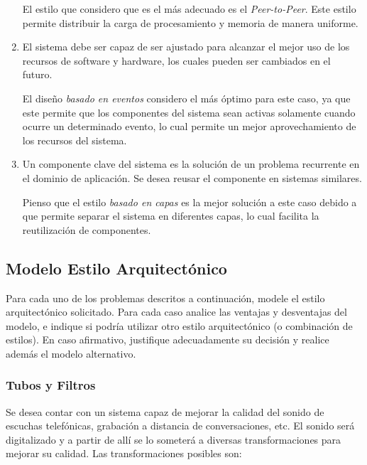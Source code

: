 \begin{enumerate}
			El estilo que considero que es el más adecuado es el \emph{Peer-to-Peer}.
			Este estilo permite distribuir la carga de procesamiento y memoria
			de manera uniforme.

		\item El sistema debe ser capaz de ser ajustado para alcanzar el mejor
			uso de los recursos de software y hardware, los cuales pueden
			ser cambiados en el futuro.

			El diseño \emph{basado en eventos} considero el más óptimo para
			este caso, ya que este permite que los componentes del sistema
			sean activas solamente cuando ocurre un determinado evento, lo cual
			permite un mejor aprovechamiento de los recursos del sistema.

		\item Un componente clave del sistema es la solución de un problema
			recurrente en el dominio de aplicación. Se desea reusar el
			componente en sistemas similares.

			Pienso que el estilo \emph{basado en capas} es la mejor solución
			a este caso debido a que permite separar el sistema en diferentes
			capas, lo cual facilita la reutilización de componentes.
	\end{enumerate}

	\subsection{Modelo Estilo Arquitectónico}

	Para cada uno de los problemas descritos a continuación, modele el
	estilo arquitectónico solicitado. Para cada caso analice las ventajas
	y desventajas del modelo, e indique si podría utilizar otro estilo
	arquitectónico (o combinación de estilos). En caso afirmativo,
	justifique adecuadamente su decisión y realice además el modelo
	alternativo.

	\subsubsection{Tubos y Filtros}

	Se desea contar con un sistema capaz de mejorar la calidad del sonido
	de escuchas telefónicas, grabación a distancia de conversaciones, etc.
	El sonido será digitalizado y a partir de allí se lo someterá a
	diversas transformaciones para mejorar su calidad. Las transformaciones
	posibles son:

